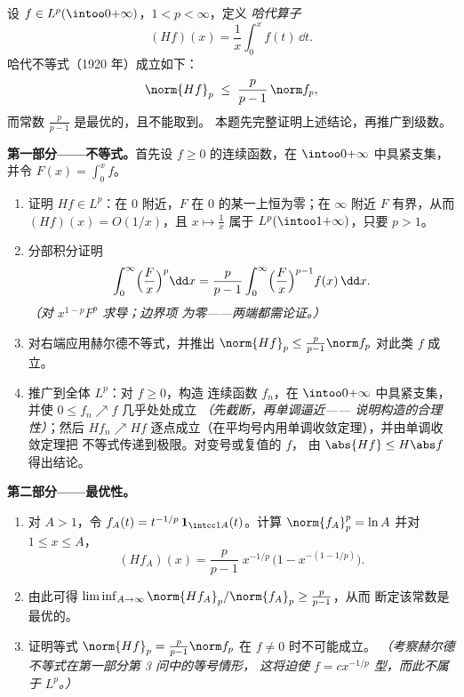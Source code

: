 \begin{problem}\label{pb:b3:lp:1}
设 $f \in L^p(\intoo0{+\infty})$，$1 < p < \infty$，定义
\emph{哈代算子}
\[
(Hf)(x) = \frac1x\int_0^x f(t)\,\dd t .
\]
哈代不等式（1920 年）成立如下：
\[
\norm{Hf}_p \;\leq\; \frac{p}{p-1}\,\norm f_p ,
\]
而常数 $\frac p{p-1}$ 是最优的，且不能取到。
本题先完整证明上述结论，再推广到级数。

\medskip
\noindent\textbf{第一部分——不等式。}首先设 $f
\geq 0$ 的连续函数，在
$\intoo0{+\infty}$ 中具紧支集，并令 $F(x) = \int_0^xf$。
\begin{enumerate}
  \item 证明 $Hf \in L^p$：在 $0$ 附近，$F$ 在
        $0$ 的某一上恒为零；在 $\infty$ 附近 $F$ 有界，从而
        $(Hf)(x) = O(1/x)$，且 $x \mapsto \frac1x$ 属于
        $L^p(\intoo1{+\infty})$，只要 $p > 1$。
  \item 分部积分证明
        \[
        \int_0^\infty \Bigl(\frac Fx\Bigr)^p\dd x
        = \frac{p}{p-1}\int_0^\infty\Bigl(\frac
        Fx\Bigr)^{p-1}f(x)\,\dd x .
        \]
        \emph{（对 $x^{1-p}F^p$ 求导；边界项
        为零——两端都需论证。）}
  \item 对右端应用赫尔德不等式，并推出
        $\norm{Hf}_p \leq \frac p{p-1}\norm f_p$ 对此类 $f$ 成立。
  \item 推广到全体 $L^p$：对 $f \geq 0$，构造
        连续函数 $f_n$，在
        $\intoo0{+\infty}$ 中具紧支集，并使 $0 \leq f_n \nearrow f$ 几乎处处成立
        \emph{（先截断，再单调逼近——
        说明构造的合理性）}；然后 $Hf_n \nearrow Hf$
        逐点成立（在平均号内用单调收敛定理），并由单调收敛定理把
        不等式传递到极限。对变号或复值的 $f$，
        由 $\abs{Hf} \leq H\abs f$ 得出结论。
\end{enumerate}

\medskip
\noindent\textbf{第二部分——最优性。}
\begin{enumerate}[resume]
  \item 对 $A > 1$，令 $f_A(t) = t^{-1/p}\,\mathbf
        1_{\intcc1A}(t)$。计算 $\norm{f_A}_p^p = \ln A$
        并对 $1 \leq x \leq A$，
        \[
        (Hf_A)(x) = \frac p{p-1}\;x^{-1/p}\,
        \bigl(1 - x^{-(1 - 1/p)}\bigr).
        \]
  \item 由此可得 $\liminf_{A\to\infty} \norm{Hf_A}_p/
        \norm{f_A}_p \geq \frac{p}{p-1}$，从而
        断定该常数是最优的。
  \item 证明等式 $\norm{Hf}_p = \frac
        p{p-1}\norm f_p$ 在 $f \neq 0$ 时不可能成立。
        \emph{（考察赫尔德不等式在第一部分第 3 问中的等号情形，
        这将迫使 $f = cx^{-1/p}$ 型，而此不属于 $L^p$。）}
\end{enumerate}


\end{problem}
